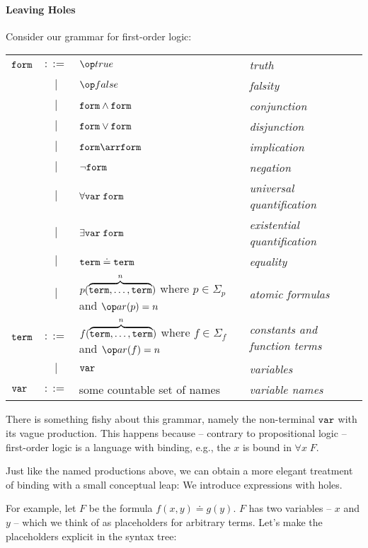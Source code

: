 \paragraph{Leaving Holes}
Consider our grammar for first-order logic:
\begin{center}
\begin{tabular}{lcl@{\tb}l}
$\mathtt{form}$ & $::=$ & $\true$ & \emph{truth} \\
        &  $|$  & $\false$ & \emph{falsity} \\
        &  $|$  & $\mathtt{form} \wedge \mathtt{form}$ & \emph{conjunction} \\
        &  $|$  & $\mathtt{form} \vee \mathtt{form}$ & \emph{disjunction} \\
        &  $|$  & $\FORM \arr \FORM$ & \emph{implication} \\
        &  $|$  & $\neg \mathtt{form}$ & \emph{negation} \\
        &  $|$  & $\forall \mathtt{var}\; \mathtt{form}$ & \emph{universal quantification} \\
        &  $|$  & $\exists \mathtt{var}\; \mathtt{form}$ & \emph{existential quantification} \\
        &  $|$  & $\mathtt{term} \doteq \mathtt{term}$ & \emph{equality} \\
        &  $|$  & $p(\overbrace{\mathtt{term},\ldots,\mathtt{term}}^n)$ where $p\in\Sigma_p$ and $\arit(p)=n$& \emph{atomic formulas} \\
$\mathtt{term}$ & $::=$ & $f(\overbrace{\mathtt{term},\ldots,\mathtt{term}}^n)$ where $f\in\Sigma_f$ and $\arit(f)=n$ & \emph{constants and function terms} \\
        &  $|$  & $\mathtt{var}$ & \emph{variables} \\
$\mathtt{var}$  & $::=$ & some countable set of names & \emph{variable names}
\end{tabular}
\end{center}

There is something fishy about this grammar, namely the non-terminal $\mathtt{var}$ with its vague production. This happens because -- contrary to propositional logic -- first-order logic is a language with binding, e.g., the $x$ is bound in $\forall x\;F$.
\medskip

Just like the named productions above, we can obtain a more elegant treatment of binding with a small conceptual leap: We introduce expressions with holes.

For example, let $F$ be the formula $f(x,y)\doteq g(y)$. $F$ has two variables -- $x$ and $y$ -- which we think of as placeholders for arbitrary terms. Let's make the placeholders explicit in the syntax tree:

